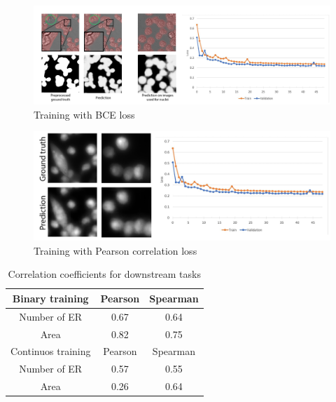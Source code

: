 \begin{figure}[H]
	\begin{center}
		\includegraphics[width=0.8\linewidth]{bilder/gfp/binary-bce/enlarged.png}
		\caption{Training with BCE loss}\label{fig:gfp-bce-predictions}
	\end{center}
\end{figure}

\begin{figure}[H]
	\begin{center}
		\includegraphics[width=0.6\linewidth]{bilder/gfp/predictions.png}
		\caption{Training with Pearson correlation loss}\label{fig:gfp-pcc-predictions}
	\end{center}
\end{figure}

\begin{table}[H]
    \centering
    \caption{Correlation coefficients for downstream tasks}
        \begin{adjustbox}{width=0.4\textwidth}
            \begin{tabular}{|c|c|c|}\hline
                Binary training&Pearson&Spearman
                \\\hline\hline
                Number of ER&0.67&0.64\\\hline
                Area&0.82&0.75\\\hline\hline
                Continuos training&Pearson&Spearman\\\hline
				Number of ER&0.57&0.55\\\hline
                Area&0.26&0.64\\\hline
            \end{tabular}
        \end{adjustbox}
\end{table}

